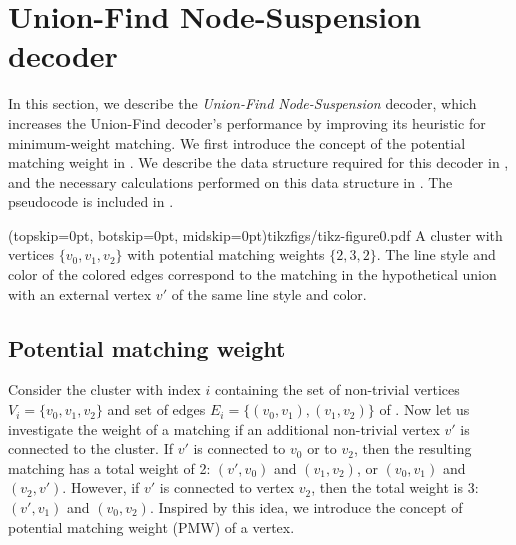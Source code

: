 \section{Union-Find Node-Suspension decoder}\label{sec:ufbb}

In this section, we describe the \emph{Union-Find Node-Suspension} decoder, which increases the Union-Find decoder's performance by improving its heuristic for minimum-weight matching. We first introduce the concept of the potential matching weight in . We describe the data structure required for this decoder in , and the necessary calculations performed on this data structure in . The pseudocode is included in . 

\Figure[htb](topskip=0pt, botskip=0pt, midskip=0pt){tikzfigs/tikz-figure0.pdf}{
    A cluster with vertices $\{v_0, v_1, v_2\}$ with potential matching weights $\{2, 3, 2\}$. The line style and color of the colored edges correspond to the matching in the hypothetical union with an external vertex $v'$ of the same line style and color.\label{fig0}}

\subsection{Potential matching weight}\label{sec:matchingweight}

Consider the cluster with index $i$ containing the set of non-trivial vertices $V_i=\{v_0,v_1,v_2\}$ and set of edges $E_i=\{(v_0,v_1), (v_1, v_2)\}$ of . Now let us investigate the weight of a matching if an additional non-trivial vertex $v'$ is connected to the cluster. If $v'$ is connected to $v_0$ or to $v_2$, then the resulting matching has a total weight of 2: $(v',v_0)$ and $(v_1,v_2)$, or $(v_0,v_1)$ and $(v_2,v')$. However, if $v'$ is connected to vertex $v_2$, then the total weight is 3: $(v', v_1)$ and $(v_0, v_2)$. Inspired by this idea, we introduce the concept of potential matching weight (PMW) of a vertex. 


